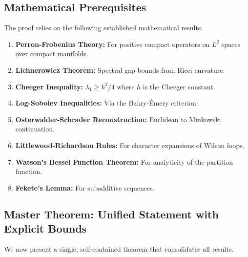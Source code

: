 \subsection{Mathematical Prerequisites}

The proof relies on the following established mathematical results:

\begin{enumerate}[label=(\alph*)]
\item \textbf{Perron-Frobenius Theory:} For positive compact operators on $L^2$ 
spaces over compact manifolds.

\item \textbf{Lichnerowicz Theorem:} Spectral gap bounds from Ricci curvature.

\item \textbf{Cheeger Inequality:} $\lambda_1 \geq h^2/4$ where $h$ is the 
Cheeger constant.

\item \textbf{Log-Sobolev Inequalities:} Via the Bakry-Émery criterion.

\item \textbf{Osterwalder-Schrader Reconstruction:} Euclidean to Minkowski 
continuation.

\item \textbf{Littlewood-Richardson Rules:} For character expansions of Wilson loops.

\item \textbf{Watson's Bessel Function Theorem:} For analyticity of the partition 
function.

\item \textbf{Fekete's Lemma:} For subadditive sequences.
\end{enumerate}

\subsection{Master Theorem: Unified Statement with Explicit Bounds}
\label{sec:master-theorem}

We now present a single, self-contained theorem that consolidates all results.

